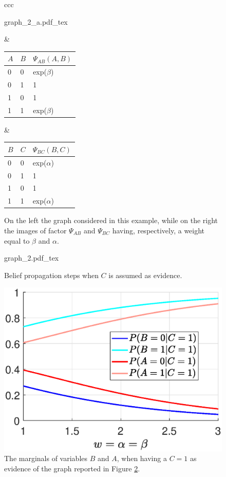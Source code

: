 \begin{figure}
\begin{tabular}{ccc}
\begin{minipage}[t]{0.25 \columnwidth}
	\centering
\def\svgwidth{0.9 \textwidth}
{graph_2_a.pdf_tex} 
\end{minipage} 
 & 
\begin{minipage}[t]{0.3 \columnwidth}
\begin{tabular}{|l|l|l|}
$A$ & $B$ & $\Psi_{AB}(A,B)$ \\
\hline
0 & 0 & exp($\beta$) \\
\hline
0 & 1 & 1 \\
\hline
1 & 0 & 1 \\
\hline
1 & 1 & exp($\beta$) \\
\hline
\end{tabular}
\end{minipage} 
 & 
\begin{minipage}[t]{0.3 \columnwidth}
\begin{tabular}{|l|l|l|}
$B$ & $C$ & $\Psi_{BC}(B,C)$ \\
\hline
0 & 0 & exp($\alpha$) \\
\hline
0 & 1 & 1 \\
\hline
1 & 0 & 1 \\
\hline
1 & 1 & exp($\alpha$) \\
\hline
\end{tabular}
\end{minipage} 
\end{tabular}
\caption{On the left the graph considered in this example, while on the right the images of factor $\Psi_{AB}$ and $\Psi_{BC}$ having, respectively, a weight equal to $\beta$  and $\alpha$. }
\label{fig:sample_02:1}
\end{figure}

\begin{figure}
	\centering
\def\svgwidth{0.65 \textwidth}
{graph_2.pdf_tex} 
\caption{Belief propagation steps when $C$ is assumed as evidence.}
\label{fig:sample_02:2}
\end{figure}

\begin{figure}
	\centering
\includegraphics[width=0.48\columnwidth]{../src/Chapter_additional/03_Samples/image_02/chain_corr.eps}
\caption{The marginals of variables $B$ and $A$, when having a $C=1$ as evidence of the graph reported in Figure \ref{fig:sample_02:2}.}
\label{fig:sample_02:3}
\end{figure} 

